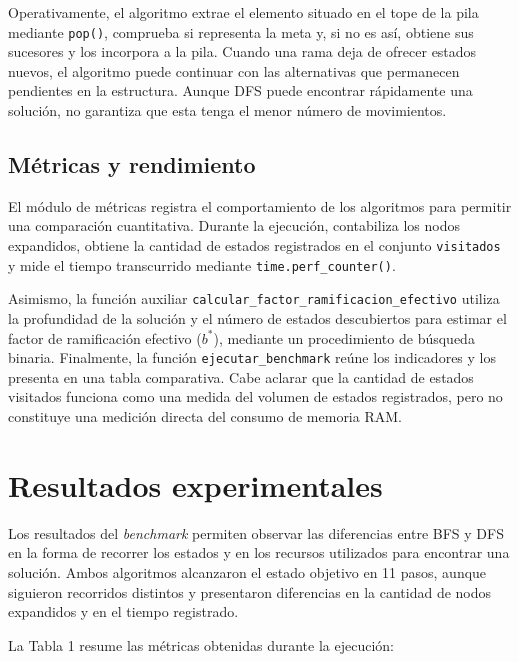\documentclass[
  spanish,
  11pt,
]{article}
\begin{document}
Operativamente, el algoritmo extrae el elemento situado en el tope de la
pila mediante \texttt{pop()}, comprueba si representa la meta y, si no
es así, obtiene sus sucesores y los incorpora a la pila. Cuando una rama
deja de ofrecer estados nuevos, el algoritmo puede continuar con las
alternativas que permanecen pendientes en la estructura. Aunque DFS
puede encontrar rápidamente una solución, no garantiza que esta tenga el
menor número de movimientos.

\subsection{Métricas y rendimiento}\label{muxe9tricas-y-rendimiento}

El módulo de métricas registra el comportamiento de los algoritmos para
permitir una comparación cuantitativa. Durante la ejecución, contabiliza
los nodos expandidos, obtiene la cantidad de estados registrados en el
conjunto \texttt{visitados} y mide el tiempo transcurrido mediante
\texttt{time.perf\_counter()}.

Asimismo, la función auxiliar
\texttt{calcular\_factor\_ramificacion\_efectivo} utiliza la profundidad
de la solución y el número de estados descubiertos para estimar el
factor de ramificación efectivo (\(b^{*}\)), mediante un procedimiento
de búsqueda binaria. Finalmente, la función \texttt{ejecutar\_benchmark}
reúne los indicadores y los presenta en una tabla comparativa. Cabe
aclarar que la cantidad de estados visitados funciona como una medida
del volumen de estados registrados, pero no constituye una medición
directa del consumo de memoria RAM.

\section{Resultados experimentales}\label{resultados-experimentales}

Los resultados del \emph{benchmark} permiten observar las diferencias
entre BFS y DFS en la forma de recorrer los estados y en los recursos
utilizados para encontrar una solución. Ambos algoritmos alcanzaron el
estado objetivo en 11 pasos, aunque siguieron recorridos distintos y
presentaron diferencias en la cantidad de nodos expandidos y en el
tiempo registrado.

La Tabla 1 resume las métricas obtenidas durante la ejecución:
\end{document}
